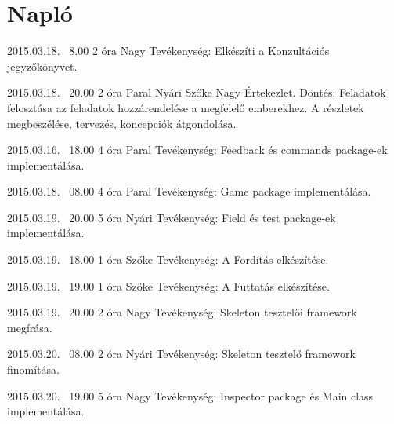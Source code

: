 %
\section{Napló}

\begin{naplo}
	
	\bejegyzes
	{2015.03.18. ~8.00}
	{2 óra}
    {Nagy} 
	{Tevékenység: Elkészíti a Konzultációs jegyzőkönyvet.\newline } 
	
	\bejegyzes
	{2015.03.18. ~20.00}
	{2 óra}
	{Paral \newline Nyári \newline Szőke \newline Nagy} 
	{Értekezlet.
		Döntés: Feladatok felosztása az feladatok hozzárendelése a megfelelő emberekhez. A részletek megbeszélése, tervezés, koncepciók átgondolása.\newline } 
	
	
	\bejegyzes
	{2015.03.16. ~18.00}
	{4 óra}
	{Paral} 
	{Tevékenység: Feedback és commands package-ek implementálása.\newline } 			
	
	\bejegyzes
	{2015.03.18. ~08.00}
	{4 óra}
	{Paral} 
	{Tevékenység: Game package implementálása.\newline }
	
	\bejegyzes
	{2015.03.19. ~20.00}
	{5 óra}
	{Nyári} 
	{Tevékenység: Field és test package-ek implementálása.\newline }	
			   	 
    \bejegyzes
    {2015.03.19. ~18.00}
    {1 óra}
    {Szőke} 
    {Tevékenység: A Fordítás elkészítése.\newline } 

    \bejegyzes
    {2015.03.19. ~19.00}
    {1 óra}
    {Szőke} 
    {Tevékenység: A Futtatás elkészítése.\newline } 
    
	\bejegyzes
	{2015.03.19. ~20.00}
	{2 óra}
	{Nagy} 
	{Tevékenység: Skeleton tesztelői framework megírása.\newline } 
	
	\bejegyzes
	{2015.03.20. ~08.00}
	{2 óra}
	{Nyári} 
	{Tevékenység: Skeleton tesztelő framework finomítása.\newline } 	

	\bejegyzes
	{2015.03.20. ~19.00}
	{5 óra}
	{Nagy} 
	{Tevékenység: Inspector package és Main class implementálása.\newline }	
	

\end{naplo}
